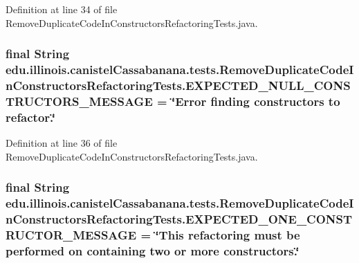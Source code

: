 Definition at line 34 of file RemoveDuplicateCodeInConstructorsRefactoringTests.java.

\hypertarget{classedu_1_1illinois_1_1canistelCassabanana_1_1tests_1_1RemoveDuplicateCodeInConstructorsRefactoringTests_a1a017b7b7c8607561e8f93423b10b0e0}{
\subsubsection[{EXPECTED\_\-NULL\_\-CONSTRUCTORS\_\-MESSAGE}]{\setlength{\rightskip}{0pt plus 5cm}final String {\bf edu.illinois.canistelCassabanana.tests.RemoveDuplicateCodeInConstructorsRefactoringTests.EXPECTED\_\-NULL\_\-CONSTRUCTORS\_\-MESSAGE} = \char`\"{}Error finding constructors to refactor.\char`\"{}}}
\label{classedu_1_1illinois_1_1canistelCassabanana_1_1tests_1_1RemoveDuplicateCodeInConstructorsRefactoringTests_a1a017b7b7c8607561e8f93423b10b0e0}


Definition at line 36 of file RemoveDuplicateCodeInConstructorsRefactoringTests.java.

\hypertarget{classedu_1_1illinois_1_1canistelCassabanana_1_1tests_1_1RemoveDuplicateCodeInConstructorsRefactoringTests_a6d44de9379cb26439ffd7e2ff29e5874}{
\subsubsection[{EXPECTED\_\-ONE\_\-CONSTRUCTOR\_\-MESSAGE}]{\setlength{\rightskip}{0pt plus 5cm}final String {\bf edu.illinois.canistelCassabanana.tests.RemoveDuplicateCodeInConstructorsRefactoringTests.EXPECTED\_\-ONE\_\-CONSTRUCTOR\_\-MESSAGE} = \char`\"{}This refactoring must be performed on containing two or more constructors.\char`\"{}}}
\label{classedu_1_1illinois_1_1canistelCassabanana_1_1tests_1_1RemoveDuplicateCodeInConstructorsRefactoringTests_a6d44de9379cb26439ffd7e2ff29e5874}


